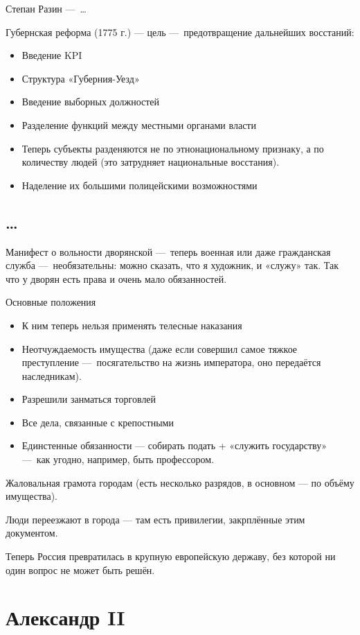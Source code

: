 \documentclass[12pt, a4paper]{article}
\begin{document}
Степан Разин — …

Губернская реформа (1775 г.) — цель — предотвращение дальнейших восстаний:

\begin{itemize}
    \item Введение KPI
    \item Структура «Губерния-Уезд»
    \item Введение выборных должностей
    \item Разделение функций между местными органами власти
    \item Теперь субъекты разденяются не по этнонациональному признаку, а по количеству людей (это затрудняет национальные восстания).
    \item Наделение их большими полицейскими возможностями
\end{itemize}


\subsection{…}

Манифест о вольности дворянской — теперь военная или даже гражданская служба 
— необязательны: можно сказать, что я художник, и «служу» так. 
Так что у дворян есть права и очень мало обязанностей.

Основные положения
\begin{itemize}
    \item К ним теперь нельзя применять телесные наказания
    \item Неотчуждаемость имущества (даже если совершил самое тяжкое преступление — посягательство на жизнь императора, оно передаётся наследникам).
    \item Разрешили занматься торговлей
    \item Все дела, связанные с крепостными
    \item Единстенные обязанности — собирать подать + «служить государству» — как угодно, например, быть профессором.
\end{itemize}

Жаловальная грамота городам (есть несколько разрядов, в основном — по объёму имущества).

Люди переезжают в города — там есть привилегии, закрплённые этим документом.


Теперь Россия превратилась в крупную европейскую державу, без которой ни один вопрос не может быть решён.

\section{Александр II}
\end{document}
